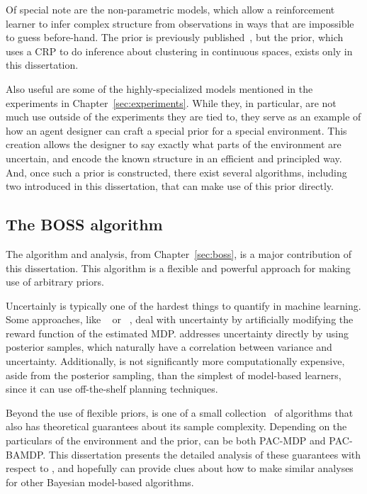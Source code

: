 Of special note are the non-parametric models, which allow a reinforcement learner to infer complex structure from observations in ways that are impossible to guess before-hand. The  prior is previously published~\cite{asmuth09}, but the  prior, which uses a CRP to do inference about clustering in continuous spaces, exists only in this dissertation.

Also useful are some of the highly-specialized models mentioned in the experiments in Chapter~\ref{sec:experiments}. While they, in particular, are not much use outside of the experiments they are tied to, they serve as an example of how an agent designer can craft a special prior for a special environment. This creation allows the designer to say exactly what parts of the environment are uncertain, and encode the known structure in an efficient and principled way. And, once such a prior is constructed, there exist several algorithms, including two introduced in this dissertation, that can make use of this prior directly.

\subsection{The BOSS algorithm}

The  algorithm and analysis, from Chapter~\ref{sec:boss}, is a major contribution of this dissertation. This algorithm is a flexible and powerful approach for making use of arbitrary priors.

Uncertainly is typically one of the hardest things to quantify in machine learning. Some approaches, like ~\cite{strehl05b} or ~\cite{brafman02}, deal with uncertainty by artificially modifying the reward function of the estimated MDP.  addresses uncertainty directly by using posterior samples, which naturally have a correlation between variance and uncertainty. Additionally,  is not significantly more computationally expensive, aside from the posterior sampling, than the simplest of model-based learners, since it can use off-the-shelf planning techniques.

Beyond the use of flexible priors,  is one of a small collection~\cite{sorg10,araya2012near,asmuth11} of algorithms that also has theoretical guarantees about its sample complexity. Depending on the particulars of the environment and the prior,  can be both PAC-MDP and PAC-BAMDP. This dissertation presents the detailed analysis of these guarantees with respect to , and hopefully can provide clues about how to make similar analyses for other Bayesian model-based algorithms.


